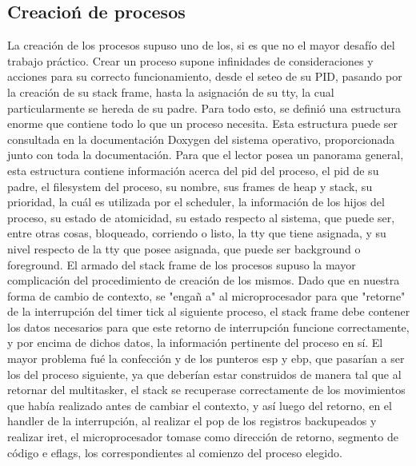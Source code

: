 \documentclass[10pt,a4paper]{article}
\begin{document}
	\subsection{Creacio\'n de procesos}
		La creaci\'on de los procesos supuso uno de los, si es que no el mayor desaf\'io del trabajo pr\'actico. Crear un proceso supone infinidades de consideraciones y acciones para su correcto funcionamiento, desde el seteo de su PID, pasando por la creaci\'on de su stack frame, hasta la asignaci\'on de su tty, la cual particularmente se hereda de su padre.
		Para todo esto, se defini\'o una estructura enorme que contiene todo lo que un proceso necesita. Esta estructura puede ser consultada en la documentaci\'on Doxygen del sistema operativo, proporcionada junto con toda la documentaci\'on.
		Para que el lector posea un panorama general, esta estructura contiene informaci\'on acerca del pid del proceso, el pid de su padre, el filesystem del proceso, su nombre, sus frames de heap y stack, su prioridad, la cu\'al es utilizada por el scheduler, la informaci\'on de los hijos del proceso, su estado de atomicidad, su estado respecto al sistema, que puede ser, entre otras cosas, bloqueado, corriendo o listo, la tty que tiene asignada, y su nivel respecto de la tty que posee asignada, que puede ser background o foreground.
		El armado del stack frame de los procesos supuso la mayor complicaci\'on del procedimiento de creaci\'on de los mismos. Dado que en nuestra forma de cambio de contexto, se "enga\~n a" al microprocesador para que "retorne" de la interrupci\'on del timer tick al siguiente proceso, el stack frame debe contener los datos necesarios para que este retorno de interrupci\'on funcione correctamente, y por encima de dichos datos, la informaci\'on pertinente del proceso en s\'i.
		El mayor problema fu\'e la confecci\'on y de los punteros esp y ebp, que pasar\'ian a ser los del proceso siguiente, ya que deber\'ian estar construidos de manera tal que al retornar del multitasker, el stack se recuperase correctamente de los movimientos que hab\'ia realizado antes de cambiar el contexto, y as\'i luego del retorno, en el handler de la interrupci\'on, al realizar el pop de los registros backupeados y realizar iret, el microprocesador tomase como direcci\'on de retorno, segmento de c\'odigo e eflags, los correspondientes al comienzo del proceso elegido.
\end{document}
